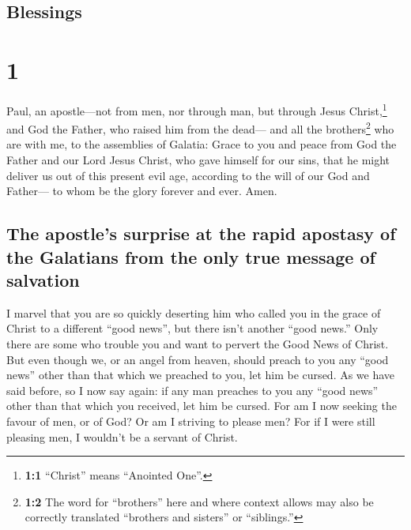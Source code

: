 \hypertarget{blessings}{%
\subsection{Blessings}\label{blessings}}

\hypertarget{section}{%
\section{1}\label{section}}

 Paul, an apostle---not from men, nor through man, but
through Jesus Christ,\footnote{\textbf{1:1} ``Christ'' means ``Anointed
  One''.} and God the Father, who raised him from the dead---
 and all the brothers\footnote{\textbf{1:2} The word for
  ``brothers'' here and where context allows may also be correctly
  translated ``brothers and sisters'' or ``siblings.''} who are with me,
to the assemblies of Galatia:  Grace to you and peace from
God the Father and our Lord Jesus Christ,  who gave
himself for our sins, that he might deliver us out of this present evil
age, according to the will of our God and Father---  to
whom be the glory forever and ever. Amen.

\hypertarget{the-apostles-surprise-at-the-rapid-apostasy-of-the-galatians-from-the-only-true-message-of-salvation}{%
\subsection{The apostle's surprise at the rapid apostasy of the
Galatians from the only true message of
salvation}\label{the-apostles-surprise-at-the-rapid-apostasy-of-the-galatians-from-the-only-true-message-of-salvation}}

 I marvel that you are so quickly deserting him who called
you in the grace of Christ to a different ``good news'', 
but there isn't another ``good news.'' Only there are some who trouble
you and want to pervert the Good News of Christ.  But even
though we, or an angel from heaven, should preach to you any ``good
news'' other than that which we preached to you, let him be cursed.
 As we have said before, so I now say again: if any man
preaches to you any ``good news'' other than that which you received,
let him be cursed.  For am I now seeking the favour of
men, or of God? Or am I striving to please men? For if I were still
pleasing men, I wouldn't be a servant of Christ.

